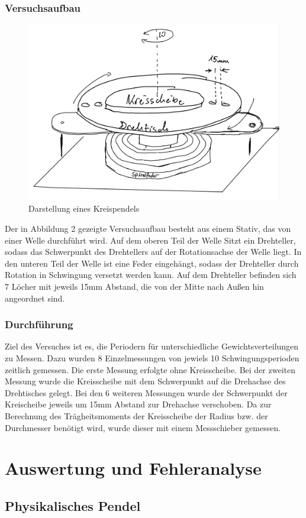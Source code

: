 \documentclass[11pt,a4paper]{article}
\begin{document}
     \subsubsection{Versuchsaufbau}
     \begin{figure}[H]
     	\includegraphics[width=0.6\linewidth]{Drehpendel.png}
     	\centering
     	\caption{Darstellung eines Kreispendels \text{[2]}}
     \end{figure}
 Der in Abbildung 2 gezeigte Versuchsaufbau besteht aus einem Stativ, das von einer Welle durchführt wird. Auf dem oberen Teil der Welle Sitzt ein Drehteller, sodass das Schwerpunkt des Drehtellers auf der Rotationsachse der Welle liegt. In den unteren Teil der Welle ist eine Feder eingehängt, sodass der Drehteller durch Rotation in Schwingung versetzt werden kann. Auf dem Drehteller befinden sich 7 Löcher mit jeweils 15mm Abstand, die von der Mitte nach Außen hin angeordnet sind.
     \subsubsection{Durchführung}
Ziel des Versuches ist es, die Periodern für unterschiedliche Gewichtsverteilungen zu Messen. Dazu wurden 8 Einzelmessungen von jewiels 10 Schwingungsperioden zeitlich gemessen.
Die erste Messung erfolgte ohne Kreisscheibe. Bei der zweiten Messung wurde die Kreisscheibe mit dem Schwerpunkt auf die Drehachse des Drehtisches gelegt. Bei den 6 weiteren Messungen wurde der Schwerpunkt der Kreischeibe jeweils um 15mm Abstand zur Drehachse verschoben.
Da zur Berechnung des Trägheitsmoments der Kreisscheibe der Radius bzw. der Durchmesser benötigt wird, wurde dieser mit einem Messschieber gemessen.
\section{Auswertung und Fehleranalyse}
	\subsection{Physikalisches Pendel}
\end{document}
